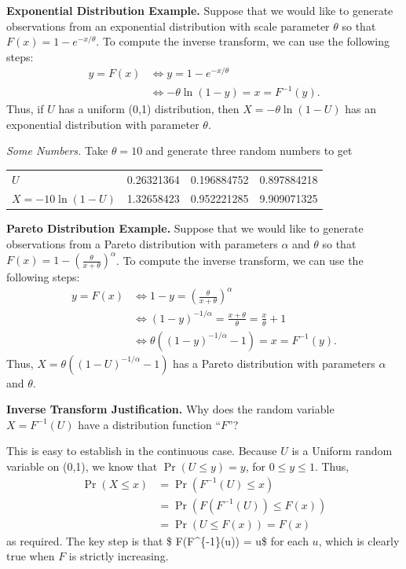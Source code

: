 \documentclass[]{book}
\begin{document}
\textbf{Exponential Distribution Example.} Suppose that we would like to
generate observations from an exponential distribution with scale
parameter \(\theta\) so that \(F(x) = 1 - e^{-x/\theta}\). To compute
the inverse transform, we can use the following steps: \[\begin{aligned}
 y = F(x) &\Leftrightarrow  y = 1-e^{-x/\theta} \\
  &\Leftrightarrow -\theta \ln(1-y) = x = F^{-1}(y) .\end{aligned}\]
Thus, if \(U\) has a uniform (0,1) distribution, then
\(X = -\theta \ln(1-U)\) has an exponential distribution with parameter
\(\theta\).

\emph{Some Numbers.} Take \(\theta = 10\) and generate three random
numbers to get

\begin{longtable}[]{@{}lrrr@{}}
\toprule
\(U\) & 0.26321364 & 0.196884752 & 0.897884218\tabularnewline
\(X = -10\ln(1-U)\) & 1.32658423 & 0.952221285 &
9.909071325\tabularnewline
\bottomrule
\end{longtable}

\textbf{Pareto Distribution Example.} Suppose that we would like to
generate observations from a Pareto distribution with parameters
\(\alpha\) and \(\theta\) so that
\(F(x) = 1 - \left(\frac{\theta}{x+\theta} \right)^{\alpha}\). To
compute the inverse transform, we can use the following steps:
\[\begin{aligned}
 y = F(x) &\Leftrightarrow 1-y = \left(\frac{\theta}{x+\theta} \right)^{\alpha} \\
  &\Leftrightarrow \left(1-y\right)^{-1/\alpha} = \frac{x+\theta}{\theta} = \frac{x}{\theta} +1 \\
    &\Leftrightarrow \theta \left((1-y)^{-1/\alpha} - 1\right) = x = F^{-1}(y) .\end{aligned}\]
Thus, \(X = \theta \left((1-U)^{-1/\alpha} - 1\right)\) has a Pareto
distribution with parameters \(\alpha\) and \(\theta\).

\textbf{Inverse Transform Justification.} Why does the random variable
\(X = F^{-1}(U)\) have a distribution function ``\(F\)''?

This is easy to establish in the continuous case. Because \(U\) is a
Uniform random variable on (0,1), we know that \(\Pr(U \le y) = y\), for
\(0 \le y \le 1\). Thus, \[\begin{aligned}
\Pr(X \le x) &= \Pr(F^{-1}(U) \le x) \\
 &= \Pr(F(F^{-1}(U)) \le F(x)) \\
&= \Pr(U \le F(x)) = F(x)\end{aligned}\] as required. The key step is
that \$ F(F\^{}\{-1\}(u)) = u\$ for each \(u\), which is clearly true
when \(F\) is strictly increasing.
\end{document}
